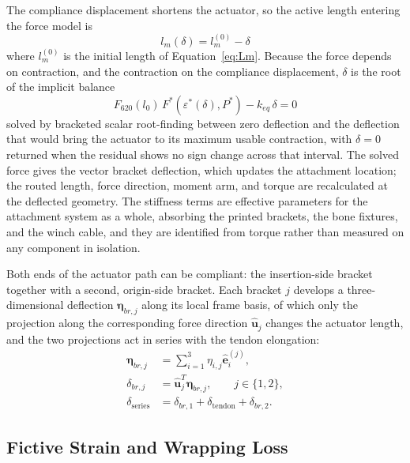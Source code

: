 \documentclass[utf8]{FrontiersinHarvard} %
\begin{document}
The compliance displacement shortens the actuator, so the active length entering the force model is
\begin{equation} l_m(\delta) = l_m^{(0)} - \delta
\label{eq:activelengthcorrected}
\end{equation}
where $l_m^{(0)}$ is the initial length of Equation~\eqref{eq:Lm}. Because the force depends on contraction, and the contraction on the compliance displacement, $\delta$ is the root of the implicit balance
\begin{equation} F_{620}(l_{0}) \, F^{*}\!\left(\varepsilon^*(\delta),P^*\right) - k_{eq}\,\delta = 0
\label{eq:complianceforcebalance}
\end{equation}
solved by bracketed scalar root-finding between zero deflection and the deflection that would bring the actuator to its maximum usable contraction, with $\delta = 0$ returned when the residual shows no sign change across that interval. The solved force gives the vector bracket deflection, which updates the attachment location; the routed length, force direction, moment arm, and torque are recalculated at the deflected geometry. The stiffness terms are effective parameters for the attachment system as a whole, absorbing the printed brackets, the bone fixtures, and the winch cable, and they are identified from torque rather than measured on any component in isolation.

Both ends of the actuator path can be compliant: the insertion-side bracket together with a second, origin-side bracket. Each bracket $j$ develops a three-dimensional deflection $\boldsymbol{\eta}_{br,j}$ along its local frame basis, of which only the projection along the corresponding force direction $\hat{\mathbf{u}}_j$ changes the actuator length, and the two projections act in series with the tendon elongation:
\begin{equation}
\begin{aligned}
\boldsymbol{\eta}_{br,j} &= \sum_{i=1}^{3}\eta_{i,j}\hat{\mathbf{e}}_i^{(j)},\\
\delta_{br,j} &= \hat{\mathbf{u}}_j^T\boldsymbol{\eta}_{br,j}, \qquad j\in\{1,2\},\\
\delta_{\mathrm{series}} &= \delta_{br,1}+\delta_{\mathrm{tendon}}+\delta_{br,2}.
\end{aligned}
\label{eq:bracket_series_projection}
\end{equation}

\subsection{Fictive Strain and Wrapping Loss}\label{sec:fictive_contraction}
\end{document}
